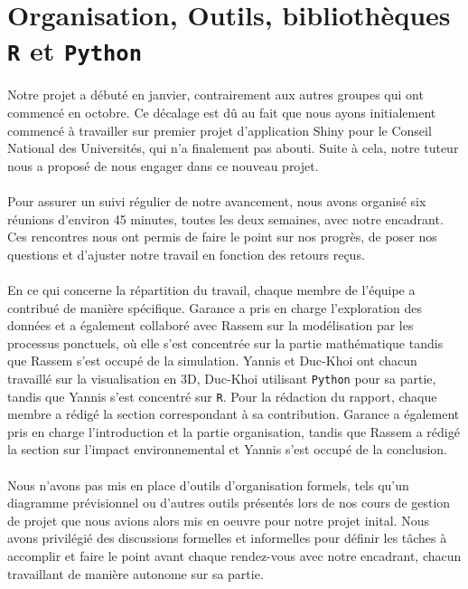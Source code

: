 \documentclass[12pt]{article}
\begin{document}
\section{Organisation, Outils, bibliothèques \texttt{R} et \texttt{Python}}
Notre projet a débuté en janvier, contrairement aux autres groupes qui ont commencé en octobre. Ce décalage est dû au fait que nous ayons initialement commencé à travailler sur  premier projet d'application Shiny pour le Conseil National des Universités, qui n'a finalement pas abouti. Suite à cela, notre tuteur nous a proposé de nous engager dans ce nouveau projet.\\
\\
Pour assurer un suivi régulier de notre avancement, nous avons organisé six réunions d'environ 45 minutes, toutes les deux semaines, avec notre encadrant. Ces rencontres nous ont permis de faire le point sur nos progrès, de poser nos questions et d'ajuster notre travail en fonction des retours reçus.\\
\\
En ce qui concerne la répartition du travail, chaque membre de l'équipe a contribué de manière spécifique. Garance a pris en charge l'exploration des données et a également collaboré avec Rassem sur la modélisation par les processus ponctuels, où elle s'est concentrée sur la partie mathématique tandis que Rassem s'est occupé de la simulation. Yannis et Duc-Khoi ont chacun travaillé sur la visualisation en 3D, Duc-Khoi utilisant \texttt{Python} pour sa partie, tandis que Yannis s'est concentré sur \texttt{R}. Pour la rédaction du rapport, chaque membre a rédigé la section correspondant à sa contribution. Garance a également pris en charge l'introduction et la partie organisation, tandis que Rassem a rédigé la section sur l'impact environnemental et Yannis s'est occupé de la conclusion.\\
\\
Nous n'avons pas mis en place d'outils d'organisation formels, tels qu'un diagramme prévisionnel ou d'autres outils présentés lors de nos cours de gestion de projet que nous avions alors mis en oeuvre pour notre projet inital. Nous avons privilégié des discussions formelles et informelles pour définir les tâches à accomplir et faire le point avant chaque rendez-vous avec notre encadrant, chacun travaillant de manière autonome sur sa partie.\\
\\
\end{document}
